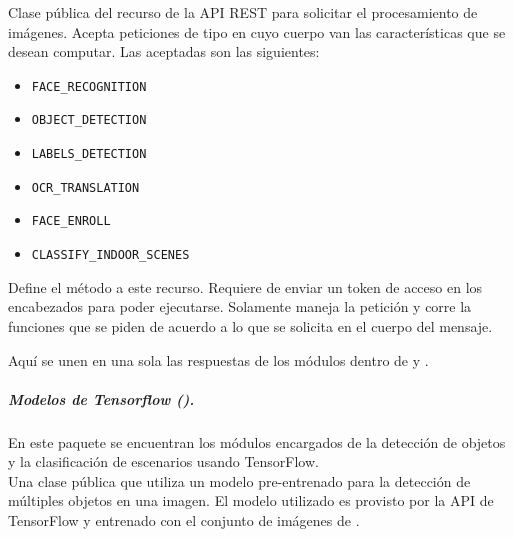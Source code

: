 Clase pública del recurso de la API REST para solicitar el procesamiento
de imágenes. Acepta peticiones de tipo  en cuyo cuerpo van las
características que se desean computar. Las aceptadas son las siguientes:
\begin{itemize}
\item {}
\texttt{FACE\_RECOGNITION}

\item {}
\texttt{OBJECT\_DETECTION}

\item {}
\texttt{LABELS\_DETECTION}

\item {}
\texttt{OCR\_TRANSLATION}

\item {}
\texttt{FACE\_ENROLL}

\item {}
\texttt{CLASSIFY\_INDOOR\_SCENES}

\end{itemize}

\begin{fulllineitems}
\label{\detokenize{chapter_two/desc_cloudnao:app.resources.vision.Vision.post}}
Define el método  a este recurso. Requiere de enviar un token
de acceso en los encabezados para poder ejecutarse. Solamente maneja la
petición y corre la funciones que se piden de acuerdo a lo que se
solicita en el cuerpo del mensaje.

Aquí se unen en una sola las respuestas de los módulos dentro de
 y .

\end{fulllineitems}



\subparagraph{Modelos de Tensorflow ().}
En este paquete se encuentran los módulos encargados de la 
detección de objetos y la clasificación de escenarios usando
TensorFlow.\\

Una clase pública que utiliza un modelo pre-entrenado para la detección
de múltiples objetos en una imagen. El modelo utilizado es
 provisto por la API de TensorFlow y entrenado con el
conjunto de imágenes de .

